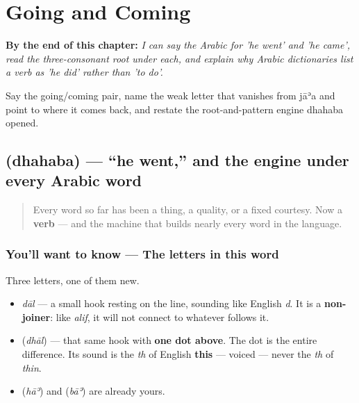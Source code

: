 
\chapter{Going and Coming}
\label{ch:ar-going-and-coming}

\begin{chapteropening}
\textbf{By the end of this chapter:} \emph{I can say the Arabic for 'he went' and 'he came', read the three-consonant root under each, and explain why Arabic dictionaries list a verb as 'he did' rather than 'to do'.}

Say the going/coming pair, name the weak letter that vanishes from jāʾa and point to where it comes back, and restate the root-and-pattern engine dhahaba opened.
\end{chapteropening}

\section[\texorpdfstring{\ar{ذهب} (dhahaba)}{ذهب (dhahaba)}]{ (dhahaba) — \textquotedblleft{}he went,\textquotedblright{} and the engine under every Arabic word}

\label{lesson:AR-C28-dhahaba}



\begin{quote}
Every word so far has been a thing, a quality, or a fixed courtesy. Now a \textbf{verb} — and the machine that builds nearly every word in the language.
\end{quote}

\subsection*{You'll want to know — The letters in this word}
Three letters, one of them new.

\begin{itemize}
\raggedright
  \item \emph{dāl} — a small hook resting on the line, sounding like English \emph{d}. It is a \textbf{non-joiner}: like \emph{alif}, it will not connect to whatever follows it.
  \item \textbf{} (\emph{dhāl}) — that same hook with \textbf{one dot above}. The dot is the entire difference. Its sound is the \emph{th} of English \textbf{this} — voiced — never the \emph{th} of \emph{thin}.
  \item \textbf{} (\emph{hāʾ}) and \textbf{} (\emph{bāʾ}) are already yours.
\end{itemize}

